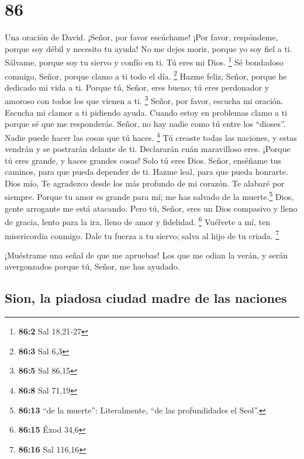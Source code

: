 \hypertarget{section-85}{%
\section{86}\label{section-85}}

Una oración de David.  ¡Señor, por favor escúchame! ¡Por
favor, respóndeme, porque soy débil y necesito tu ayuda! 
No me dejes morir, porque yo soy fiel a ti. Sálvame, porque soy tu
siervo y confío en ti. Tú eres mi Dios. \footnote{\textbf{86:2} Sal
  18,21-27}  Sé bondadoso conmigo, Señor, porque clamo a
ti todo el día. \footnote{\textbf{86:3} Sal 6,3}  Hazme
feliz, Señor, porque he dedicado mi vida a ti.  Porque tú,
Señor, eres bueno; tú eres perdonador y amoroso con todos los que vienen
a ti. \footnote{\textbf{86:5} Sal 86,15}  Señor, por
favor, escucha mi oración. Escucha mi clamor a ti pidiendo ayuda.
 Cuando estoy en problemas clamo a ti porque sé que me
responderás.  Señor, no hay nadie como tú entre los
``dioses''. Nadie puede hacer las cosas que tú haces. \footnote{\textbf{86:8}
  Sal 71,19}  Tú creaste todas las naciones, y estas
vendrán y se postrarán delante de ti. Declararán cuán maravilloso eres.
 ¡Porque tú eres grande, y haces grandes cosas! Solo tú
eres Dios.  Señor, enséñame tus caminos, para que pueda
depender de ti. Hazme leal, para que pueda honrarte. 
Dios mío, Te agradezco desde los más profundo de mi corazón. Te alabaré
por siempre.  Porque tu amor es grande para mí; me has
salvado de la muerte.\footnote{\textbf{86:13} ``de la muerte'':
  Literalmente, ``de las profundidades el Seol''.}  Dios,
gente arrogante me está atacando.  Pero tú, Señor, eres
un Dios compasivo y lleno de gracia, lento para la ira, lleno de amor y
fidelidad. \footnote{\textbf{86:15} Éxod 34,6}  Vuélvete
a mí, ten misericordia conmigo. Dale tu fuerza a tu siervo; salva al
hijo de tu criada. \footnote{\textbf{86:16} Sal 116,16}

 ¡Muéstrame una señal de que me apruebas! Los que me
odian la verán, y serán avergonzados porque tú, Señor, me has ayudado.

\hypertarget{sion-la-piadosa-ciudad-madre-de-las-naciones}{%
\subsection{Sion, la piadosa ciudad madre de las
naciones}\label{sion-la-piadosa-ciudad-madre-de-las-naciones}}

